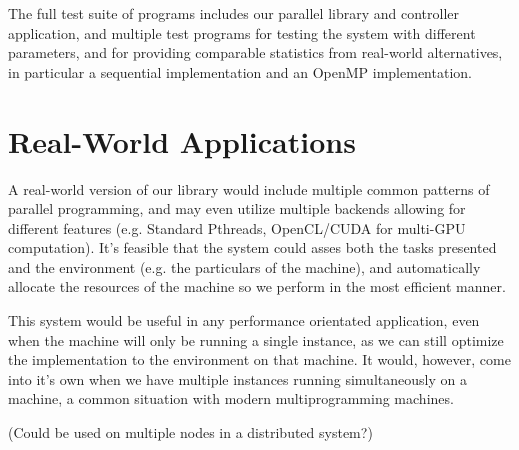 The full test suite of programs includes our parallel library and controller application, and multiple test programs for testing the system with different parameters, and for providing comparable statistics from real-world alternatives, in particular a sequential implementation and an OpenMP implementation.

\section{Real-World Applications}

A real-world version of our library would include multiple common patterns of parallel programming, and may even utilize multiple backends allowing for different features (e.g. Standard Pthreads, OpenCL/CUDA for multi-GPU computation). It's feasible that the system could asses both the tasks presented and the environment (e.g. the particulars of the machine), and automatically allocate the resources of the machine so we perform in the most efficient manner.

This system would be useful in any performance orientated application, even when the machine will only be running a single instance, as we can still optimize the implementation to the environment on that machine. It would, however, come into it's own when we have multiple instances running simultaneously on a machine, a common situation with modern multiprogramming machines.

(Could be used on multiple nodes in a distributed system?)